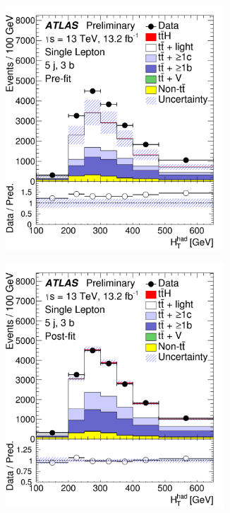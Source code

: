 \begin{figure}[htbp!]
\begin{subfigure}{0.24\textwidth}
  \caption{}
  \label{}
\end{subfigure}
\begin{subfigure}{0.24\textwidth}
  \centering
  \includegraphics[width=0.9\textwidth]{figures/ttH/fig_08c.png}
  \caption{}
  \label{}
\end{subfigure}
\begin{subfigure}{0.24\textwidth}
  \centering
  \includegraphics[width=0.9\textwidth]{figures/ttH/fig_08d.png}

\end{subfigure}
\end{figure}
